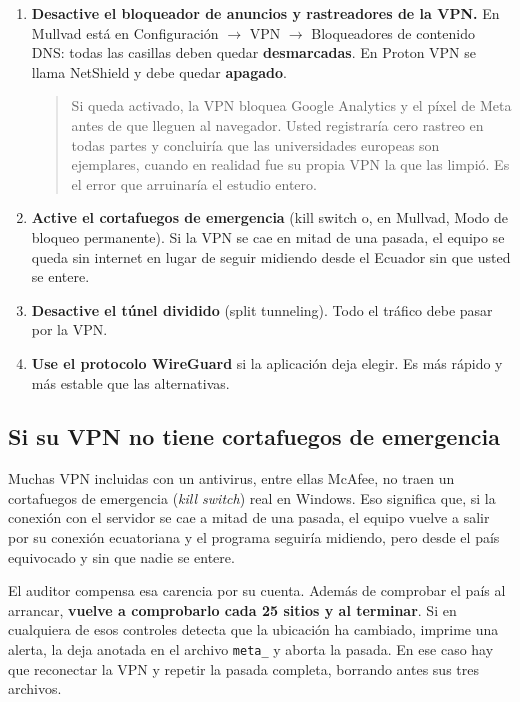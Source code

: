 \documentclass[11pt,a4paper]{article}
\begin{document}
\begin{enumerate}
	\item \textbf{Desactive el bloqueador de anuncios y rastreadores de la VPN.} En Mullvad está en \textsf{Configuración $\rightarrow$ VPN $\rightarrow$ Bloqueadores de contenido DNS}: todas las casillas deben quedar \textbf{desmarcadas}. En Proton VPN se llama \textsf{NetShield} y debe quedar \textbf{apagado}.
	\begin{quote}
		\small Si queda activado, la VPN bloquea Google Analytics y el píxel de Meta antes de que lleguen al navegador. Usted registraría cero rastreo en todas partes y concluiría que las universidades europeas son ejemplares, cuando en realidad fue su propia VPN la que las limpió. Es el error que arruinaría el estudio entero.
	\end{quote}

	\item \textbf{Active el cortafuegos de emergencia} (\textsf{kill switch} o, en Mullvad, \textsf{Modo de bloqueo permanente}). Si la VPN se cae en mitad de una pasada, el equipo se queda sin internet en lugar de seguir midiendo desde el Ecuador sin que usted se entere.

	\item \textbf{Desactive el túnel dividido} (\textsf{split tunneling}). Todo el tráfico debe pasar por la VPN.

	\item \textbf{Use el protocolo WireGuard} si la aplicación deja elegir. Es más rápido y más estable que las alternativas.
\end{enumerate}

\subsection{Si su VPN no tiene cortafuegos de emergencia}

Muchas VPN incluidas con un antivirus, entre ellas McAfee, no traen un cortafuegos de emergencia (\textit{kill switch}) real en Windows. Eso significa que, si la conexión con el servidor se cae a mitad de una pasada, el equipo vuelve a salir por su conexión ecuatoriana y el programa seguiría midiendo, pero desde el país equivocado y sin que nadie se entere.

El auditor compensa esa carencia por su cuenta. Además de comprobar el país al arrancar, \textbf{vuelve a comprobarlo cada 25 sitios y al terminar}. Si en cualquiera de esos controles detecta que la ubicación ha cambiado, imprime una alerta, la deja anotada en el archivo \texttt{meta\_} y aborta la pasada. En ese caso hay que reconectar la VPN y repetir la pasada completa, borrando antes sus tres archivos.
\end{document}
